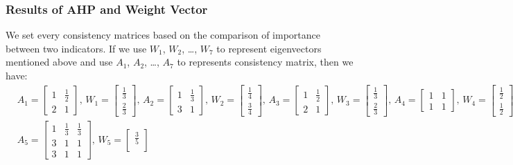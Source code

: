 \documentclass[12pt]{mcmthesis}
\begin{document}
\subsubsection{Results of AHP and Weight Vector}
	We set every consistency matrices based on the comparison of importance between two indicators. If we use $W_1$, $W_2$, \ldots, $W_7$ to represent eigenvectors mentioned above and use $A_1$, $A_2$, \ldots, $A_7$ to represents consistency matrix, then we have:
	\begin{equation}\nonumber
	\begin{aligned}
		&A_1 = 
		\begin{bmatrix}
		1&\frac{1}{2}\\
		2&1
		\end{bmatrix}
		\text{, }
		W_1 = 
		\begin{bmatrix}
		\frac{1}{3}\\
		\frac{2}{3}
		\end{bmatrix}
		\text{, }
			A_2 = \begin{bmatrix}
		1 & \frac{1}{3}\\
		3&1
		\end{bmatrix}
		\text{, }
		W_2 = 
		\begin{bmatrix}
		\frac{1}{4}\\
		\frac{3}{4}
		\end{bmatrix}
		\text{, }
			A_3 = \begin{bmatrix}
		1 & \frac{1}{2}\\
		2&1
		\end{bmatrix}	
		\text{, }
		W_3 = 
		\begin{bmatrix}
		\frac{1}{3}\\
		\frac{2}{3}
		\end{bmatrix}
		\text{, }
			A_4 = \begin{bmatrix}
		1 & 1\\
		1&1
		\end{bmatrix}
		\text{, }
		W_4 = 
		\begin{bmatrix}
		\frac{1}{2}\\
		\frac{1}{2}
		\end{bmatrix}
		\text{, }
		\\
			&A_5 = \begin{bmatrix}
		1 & \frac{1}{3}& \frac{1}{3}\\
		3&1&1\\
		3&1&1
		\end{bmatrix}
		\text{, }		
		W_5 = 
		\begin{bmatrix}
		\frac{3}{5}\\

\end{bmatrix}
\end{aligned}
\end{equation}
\end{document}
